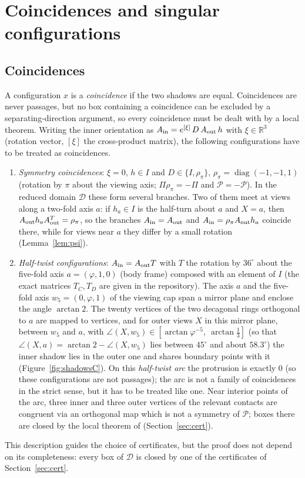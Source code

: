 \documentclass[11pt]{amsart}
\theoremstyle{definition}
\newcommand{\R}{\mathbb{R}}
\newcommand{\gr}{\varphi}          %
\newcommand{\Prj}{\Pi}
\newcommand{\RID}{\mathcal{P}}
\begin{document}
\section{Coincidences and singular configurations}\label{sec:coinc}

\subsection{Coincidences}
A configuration $x$ is a \emph{coincidence} if the two shadows are equal. Coincidences are never passages, but no
box containing a coincidence can be excluded by a separating-direction argument, so every coincidence must be dealt
with by a local theorem. Writing the inner orientation as
$A_{\rm in}=e^{[\xi]}\,D\,A_{\rm out}\,h$ with $\xi\in\R^3$ (rotation vector, $[\xi]$ the cross-product matrix), the
following configurations have to be treated as coincidences.
\begin{enumerate}[label=(\alph*)]
\item \emph{Symmetry coincidences}: $\xi=0$, $h\in I$ and $D\in\{I,\rho_\pi\}$, $\rho_\pi=\operatorname{diag}(-1,-1,1)$
  (rotation by $\pi$ about the viewing axis; $\Prj\rho_\pi=-\Prj$ and $\RID=-\RID$). In the reduced domain
  $\mathcal D$ these form several branches. Two of them meet at views along a two-fold axis $a$: if $h_a\in I$ is the
  half-turn about $a$ and $X=a$, then $A_{\rm out}h_aA_{\rm out}^T=\rho_\pi$, so the branches $A_{\rm in}=A_{\rm out}$ and
  $A_{\rm in}=\rho_\pi A_{\rm out}h_a$ coincide there, while for views near $a$ they differ by a small rotation
  (Lemma~\ref{lem:psi}).
\item \emph{Half-twist configurations}: $A_{\rm in}=A_{\rm out}T$ with $T$ the rotation by $36^\circ$ about the
  five-fold axis $a=(\gr,1,0)$ (body frame) composed with an element of $I$ (the exact matrices $T_C,T_D$ are given in
  the repository). The axis $a$ and the five-fold axis $w_5=(0,\gr,1)$ of the viewing cap span a mirror plane and
  enclose the angle $\arctan2$. The twenty vertices of the two decagonal rings orthogonal to $a$ are mapped to
  vertices, and for outer views $X$ in this mirror plane, between $w_5$ and $a$, with
  $\angle(X,w_5)\in[\arctan\gr^{-5},\ \arctan\tfrac13]$ (so that $\angle(X,a)=\arctan2-\angle(X,w_5)$ lies between
  $45^\circ$ and about $58.3^\circ$) the inner shadow lies in the outer one and shares boundary
  points with it (Figure~\ref{fig:shadowsC}). On this \emph{half-twist arc} the protrusion is exactly $0$ (so these
  configurations are not passages); the arc is not a family of coincidences in the strict sense, but it has to be
  treated like one. Near interior points of the arc, three inner and three outer vertices of the relevant contacts are
  congruent via an orthogonal map which is not a symmetry of $\RID$; boxes there are closed by the local theorem of
  \cite{SY25} (Section~\ref{sec:cert}).
\end{enumerate}
This description guides the choice of certificates, but the proof does not depend on its completeness: every box of
$\mathcal D$ is closed by one of the certificates of Section~\ref{sec:cert}.
\end{document}
